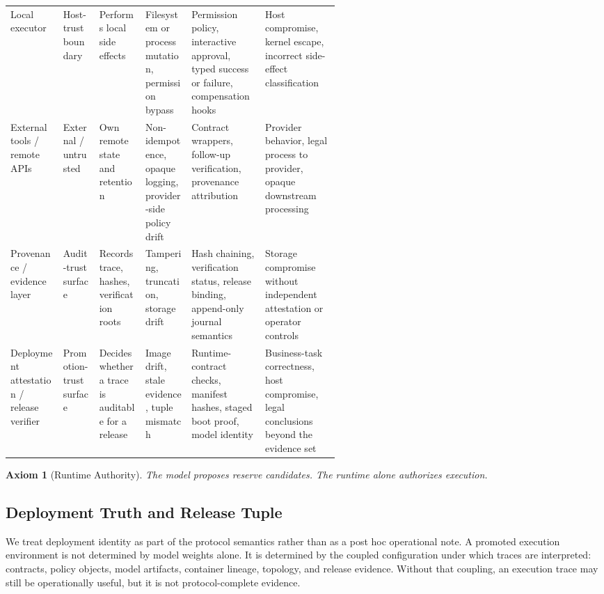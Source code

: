 \documentclass[11pt]{article}
\newtheorem{axiom}{Axiom}[section]
\theoremstyle{remark}
\begin{document}
\begin{table}[H]
\begin{tabularx}{\linewidth}{@{}>{\raggedright\arraybackslash}p{0.16\linewidth}>{\raggedright\arraybackslash}p{0.11\linewidth}>{\raggedright\arraybackslash}p{0.14\linewidth}>{\raggedright\arraybackslash}p{0.14\linewidth}XX@{}}
\addlinespace
Local executor & Host-trust boundary & Performs local side effects & Filesystem or process mutation, permission bypass & Permission policy, interactive approval, typed success or failure, compensation hooks & Host compromise, kernel escape, incorrect side-effect classification \\
\addlinespace
External tools / remote APIs & External / untrusted & Own remote state and retention & Non-idempotence, opaque logging, provider-side policy drift & Contract wrappers, follow-up verification, provenance attribution & Provider behavior, legal process to provider, opaque downstream processing \\
\addlinespace
Provenance / evidence layer & Audit-trust surface & Records trace, hashes, verification roots & Tampering, truncation, storage drift & Hash chaining, verification status, release binding, append-only journal semantics & Storage compromise without independent attestation or operator controls \\
\addlinespace
Deployment attestation / release verifier & Promotion-trust surface & Decides whether a trace is auditable for a release & Image drift, stale evidence, tuple mismatch & Runtime-contract checks, manifest hashes, staged boot proof, model identity & Business-task correctness, host compromise, legal conclusions beyond the evidence set \\
\bottomrule
\end{tabularx}
\end{table}

\begin{axiom}[Runtime Authority]\label{ax:runtime-authority}
The model proposes reserve candidates. The runtime alone authorizes execution.
\end{axiom}

\subsection{Deployment Truth and Release Tuple}\label{sec:deployment-truth}

We treat deployment identity as part of the protocol semantics rather than as a post hoc operational note. A promoted execution environment is not determined by model weights alone. It is determined by the coupled configuration under which traces are interpreted: contracts, policy objects, model artifacts, container lineage, topology, and release evidence. Without that coupling, an execution trace may still be operationally useful, but it is not protocol-complete evidence.
\end{document}
